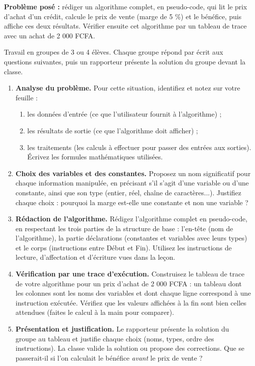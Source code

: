 \documentclass[11pt]{article}
\newcommand{\cle}[1]{{\popxbold\color{popdark}#1}}
\newcounter{popsec}
\newcounter{popsub}
\newcommand{\courssub}[1]{%
  \stepcounter{popsub}%
  \par\vspace{9pt}\noindent{\popxbold\fontsize{11.5}{13}\selectfont\color{popink}{\color{poporange}\thepopsec.\thepopsub}\hspace{6pt}#1}\par\nopagebreak\vspace{4pt}
}
\begin{document}
\textbf{Problème posé :} rédiger un algorithme complet, en pseudo-code, qui lit le prix d'achat d'un crédit, calcule le prix de vente (marge de 5 \%) et le bénéfice, puis affiche ces deux résultats. Vérifier ensuite cet algorithme par un tableau de trace avec un achat de 2 000 FCFA.

\courssub{Consignes}

Travail en groupes de 3 ou 4 élèves. Chaque groupe répond par écrit aux questions suivantes, puis un rapporteur présente la solution du groupe devant la classe.

\begin{enumerate}
\item \textbf{Analyse du problème.} Pour cette situation, identifiez et notez sur votre feuille :
\begin{enumerate}
\item les \cle{données d'entrée} (ce que l'utilisateur fournit à l'algorithme) ;
\item les \cle{résultats de sortie} (ce que l'algorithme doit afficher) ;
\item les \cle{traitements} (les calculs à effectuer pour passer des entrées aux sorties). Écrivez les formules mathématiques utilisées.
\end{enumerate}
\item \textbf{Choix des variables et des constantes.} Proposez un nom significatif pour chaque information manipulée, en précisant s'il s'agit d'une \cle{variable} ou d'une \cle{constante}, ainsi que son \cle{type} (entier, réel, chaîne de caractères...). Justifiez chaque choix : pourquoi la marge est-elle une constante et non une variable ?
\item \textbf{Rédaction de l'algorithme.} Rédigez l'algorithme complet en pseudo-code, en respectant les trois parties de la structure de base : l'\cle{en-tête} (nom de l'algorithme), la partie \cle{déclarations} (constantes et variables avec leurs types) et le \cle{corps} (instructions entre Début et Fin). Utilisez les instructions de lecture, d'affectation et d'écriture vues dans la leçon.
\item \textbf{Vérification par une trace d'exécution.} Construisez le tableau de trace de votre algorithme pour un prix d'achat de 2 000 FCFA : un tableau dont les colonnes sont les noms des variables et dont chaque ligne correspond à une instruction exécutée. Vérifiez que les valeurs affichées à la fin sont bien celles attendues (faites le calcul à la main pour comparer).
\item \textbf{Présentation et justification.} Le rapporteur présente la solution du groupe au tableau et justifie chaque choix (noms, types, ordre des instructions). La classe valide la solution ou propose des corrections. Que se passerait-il si l'on calculait le bénéfice \emph{avant} le prix de vente ?
\end{enumerate}
\end{document}
